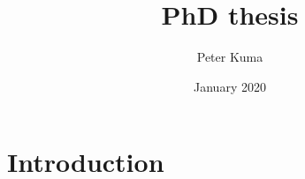 \documentclass{article}
\title{PhD thesis}
\author{Peter Kuma}
\date{January 2020}
\begin{document}
\maketitle

\section{Introduction}
\end{document}
